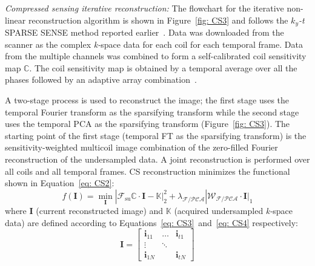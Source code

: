 \textit{Compressed sensing iterative reconstruction:}
The flowchart for the iterative non-linear reconstruction algorithm is shown in Figure~\ref{fig: CS3} and follows the $k_y$\textit{-t} SPARSE SENSE method reported earlier~\cite{RNCS9, RNCS10, RNCS14}. 
Data was downloaded from the scanner as the complex \mbox{\textit{k-}space} data for each coil for each temporal frame. 
Data from the multiple channels was combined to form a self-calibrated coil sensitivity map $\mathbb{C}$. 
The coil sensitivity map is obtained by a temporal average over all the phases followed by an adaptive array combination~\cite{RNCS15}.

A two-stage process is used to reconstruct the image; the first stage uses the temporal Fourier transform as the sparsifying transform while the second stage uses the temporal PCA as the sparsifying transform (Figure~\ref{fig: CS3}). 
The starting point of the first stage (temporal FT as the sparsifying transform) is the sensitivity-weighted multicoil image combination of the zero-filled Fourier reconstruction of the undersampled data. 
A joint reconstruction is performed over all coils and all temporal frames. 
CS reconstruction minimizes the functional shown in Equation~\ref{eq: CS2}:
\begin{equation}\label{eq: CS2}
f\left(\mathbf{I}\right) = \min_{\mathbf{I}} |{\mathcal{F}_{\mathrm{su}} \mathbb{C} \cdot \mathbf{I} - \mathbb{K}| _{2}^{2}} + \lambda_{\mathcal{F}/\mathcal{PCA}} |{\mathcal{W}_{\mathcal{F}/\mathcal{PCA}} \cdot \mathbf{I}}|_1
\end{equation}
where $\mathbf{I}$ (current reconstructed image) and $\mathbb{K}$ (acquired undersampled \mbox{\textit{k-}space} data) are defined according to Equations~\ref{eq: CS3}~and~\ref{eq: CS4} respectively:
\begin{equation}\label{eq: CS3}
\mathbf{I} = \begin{bmatrix} 
    \mathbf{i}_{11} & \dots & \mathbf{i}_{t1} \\
    \vdots & \ddots & \\
    \mathbf{i}_{1N} &        & \mathbf{i}_{tN} 
    \end{bmatrix}
\end{equation}
